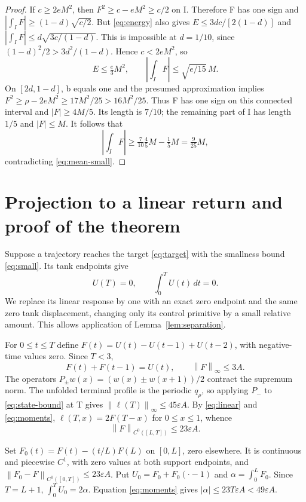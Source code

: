 \documentclass[11pt]{article}
\newcommand{\norm}[1]{\left\|#1\right\|}
\begin{document}
\begin{proof}
If $c\ge2eM^2$, then $F^2\ge c-eM^2\ge c/2$ on I. Therefore F has
one sign and $|\int_I F|\ge(1-d)\sqrt{c/2}$. But \eqref{eq:energy}
also gives $E\le3dc/[2(1-d)]$ and
$|\int_I F|\le d\sqrt{3c/(1-d)}$. This is impossible at $d=1/10$,
since $(1-d)^2/2>3d^2/(1-d)$. Hence $c<2eM^2$, so
\begin{equation}\label{eq:mean-small}
E\le\tfrac e3M^2,\qquad \left|\int_I F\right|\le\sqrt{e/15}\,M.
\end{equation}
On $[2d,1-d]$, b equals one and the presumed approximation implies
$F^2\ge\rho-2eM^2\ge17M^2/25>16M^2/25$. Thus F has one sign on
this connected interval and $|F|\ge4M/5$. Its length is $7/10$; the
remaining part of I has length $1/5$ and $|F|\le M$. It follows that
\[
\left|\int_I F\right|\ge\tfrac7{10}\tfrac45M-\tfrac15M
=\tfrac9{25}M,
\]
contradicting \eqref{eq:mean-small}.
\end{proof}

\section{Projection to a linear return and proof of the theorem}
Suppose a trajectory reaches the target \eqref{eq:target} with the smallness
bound \eqref{eq:small}. Its tank endpoints give
\begin{equation}\label{eq:moments}
U(T)=0,\qquad \int_0^T U(t)\,dt=0.
\end{equation}
We replace its linear response by one with an exact zero endpoint and the
same zero tank displacement, changing only its control primitive by a small
relative amount. This allows application of Lemma~\ref{lem:separation}.

For $0\le t\le T$ define
$F(t)=U(t)-U(t-1)+U(t-2)$, with negative-time values zero. Since $T<3$,
\[
F(t)+F(t-1)=U(t),\qquad \norm{F}_\infty\le3A.
\]
The operators $P_\pm w(x)=(w(x)\pm w(x+1))/2$ contract the supremum norm.
The unfolded terminal profile is the periodic $q_\rho$, so applying $P_-$
to \eqref{eq:state-bound} at T gives
$\norm{\ell(T)}_\infty\le45\varepsilon A$. By \eqref{eq:linear} and
\eqref{eq:moments}, $\ell(T,x)=2F(T-x)$ for $0\le x\le1$, whence
\begin{equation}\label{eq:tail}
\norm{F}_{C^0([L,T])}\le23\varepsilon A.
\end{equation}

Set $F_0(t)=F(t)-(t/L)F(L)$ on $[0,L]$, zero elsewhere. It is continuous
and piecewise $C^1$, with zero values at both support endpoints, and
$\norm{F_0-F}_{C^0([0,T])}\le23\varepsilon A$. Put
$U_0=F_0+F_0(\cdot-1)$ and $\alpha=\int_0^LF_0$.
Since $T=L+1$, $\int_0^TU_0=2\alpha$. Equation \eqref{eq:moments} gives
$|\alpha|\le23T\varepsilon A<49\varepsilon A$.
\end{document}
